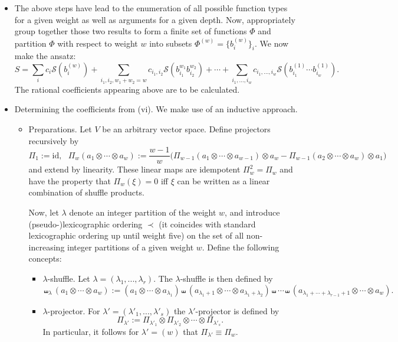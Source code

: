 \documentclass[10pt]{article}
\newcommand*{\id}{\mathrm{id}}
\newcommand*{\sff}{\mathcal{S}}
\begin{document}
\begin{itemize}
\begin{itemize}
\begin{itemize}
\end{itemize}
\end{itemize}
\item[(vi)] The above steps have lead to the enumeration of all possible function types for a given weight as well as arguments for a given depth. Now, appropriately group together those two results to form a finite set of functions $\Phi$ and partition $\Phi$ with respect to weight $w$ into subsets $\Phi^{(w)} = \{b_i^{(w)}\}_i$. We now make the ansatz:
\begin{equation*}
S = \sum_i c_i \sff(b_i^{(w)}) + \sum_{i_1, i_2, w_1 + w_2 = w} c_{i_1, i_2} \sff (b_{i_1}^{w_1} b_{i_2}^{w_2}) + \cdots + \sum_{i_1, ..., i_w} c_{i_1, ..., i_w} \sff (b_{i_1}^{(1)} \cdots b_{i_w}^{(1)}).
\end{equation*}
The rational coefficients appearing above are to be calculated.

\item[(vii)] Determining the coefficients from (vi). We make use of an inductive approach.
\begin{itemize}
\item[(vii.i)] Preparations. Let $V$ be an arbitrary vector space. Define projectors recursively by
\begin{equation*}
\Pi_1 := \id, \ \ \ \Pi_w(a_1 \otimes \cdots \otimes a_w) := \frac{w-1}{w} \big( \Pi_{w-1}(a_1 \otimes \cdots \otimes a_{w-1}) \otimes a_w - \Pi_{w-1}(a_2 \otimes \cdots \otimes a_w) \otimes a_1 \big)
\end{equation*}
and extend by linearity. These linear maps are idempotent $\Pi^2_w = \Pi_w$ and have the property that $\Pi_w(\xi) = 0$ iff $\xi$ can be written as a linear combination of shuffle products.

Now, let $\lambda$ denote an integer partition of the weight $w$, and introduce (pseudo-)lexicographic ordering $\prec$ (it coincides with standard lexicographic ordering up until weight five) on the set of all non-increasing integer partitions of a given weight $w$. Define the following concepts:
\begin{itemize}
\item $\lambda$-shuffle. Let $\lambda = (\lambda_1, ..., \lambda_r)$. The $\lambda$-shuffle is then defined by
\begin{equation*}
\shuffle_{\lambda} (a_1 \otimes \cdots \otimes a_w) := (a_1 \otimes \cdots \otimes a_{\lambda_1}) \shuffle (a_{\lambda_1 + 1} \otimes \cdots \otimes a_{\lambda_1 + \lambda_2}) \shuffle \cdots \shuffle (a_{\lambda_1 + \cdots + \lambda_{r-1}+1} \otimes \cdots \otimes a_w).
\end{equation*}
\item $\lambda$-projector. For $\lambda' = (\lambda'_1, ..., \lambda'_s)$ the $\lambda'$-projector is defined by
\begin{equation*}
\Pi_{\lambda'} := \Pi_{\lambda'_1} \otimes \Pi_{\lambda'_2} \otimes \cdots \otimes \Pi_{\lambda'_s}.
\end{equation*}
In particular, it follows for $\lambda' = (w)$ that $\Pi_{\lambda'} \equiv \Pi_w$.
\end{itemize}


\end{itemize}
\end{itemize}
\end{document}
